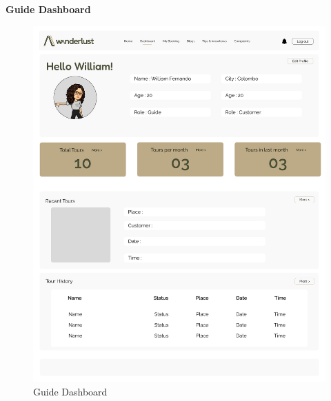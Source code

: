 \textbf{Guide Dashboard}\\
\begin{figure}[h!]
    \centering
    \includegraphics[width=1\textwidth]{Images/Wireframes/Guide Dashboard.png}
    \caption{Guide Dashboard}
\end{figure}
\clearpage

